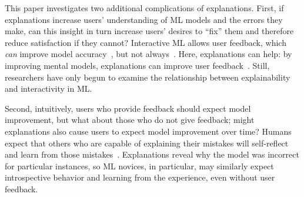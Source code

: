This paper investigates two additional complications of
explanations. %
First, if explanations increase users'
understanding of ML models and the errors they make, can
this insight in turn increase users' desires to ``fix'' them and therefore reduce satisfaction if they cannot?
%
Interactive ML allows user feedback, which \emph{can} improve
model accuracy~\cite{Fails2003InteractiveLearning,
Raghavan2006ActiveInstances, Settles2011ClosingInstances}, but not
always~\cite{Ahn2007OpenHarm, Wu2019LocalAnalysis}.
%
Here, explanations can help: by improving mental models, explanations
can improve user
feedback~\cite{Kulesza2015PrinciplesLearning,
Rosenthal2010TowardsData}. Still, researchers have only begun to
examine the relationship between explainability and interactivity in ML.
%

Second, intuitively, users who provide feedback should expect model improvement, but what about those who do not give feedback; might
explanations also cause users to expect model improvement over time?
%
Humans expect that others who are capable of explaining their mistakes will self-reflect and learn from those mistakes~\cite{Siegler2009MicrogeneticSelf-explanation}.
Explanations reveal why the model was incorrect for
particular instances, so ML novices, in particular, may similarly expect introspective behavior and learning from the experience, even without user feedback. 



